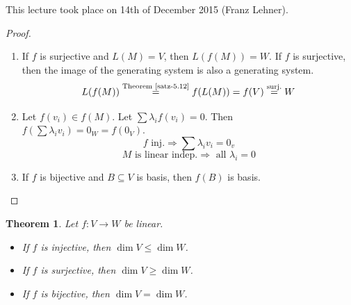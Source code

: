 \documentclass[a4paper,landscape,twocolumn]{article}
\newcommand\meta[3]{This #1 took place on #2 (#3).\par}
\newtheorem{theorem}{Theorem}
\begin{document}
\meta{lecture}{14th of December 2015}{Franz Lehner}

\begin{proof}
  \label{proof-5-13}
  \begin{enumerate}
    \item
      If $f$ is surjective and $L(M) = V$, then $L(f(M)) = W$.
      If $f$ is surjective, then the image of the generating system is also a generating system.
      \[ L(f(M)) \stackrel{\text{Theorem~\ref{satz-5.12}}}{=} f(L(M)) = f(V) \stackrel{\text{surj.}}{=} W \]
    \item
      Let $f(v_i) \in f(M)$.
      Let $\sum \lambda_i f(v_i) = 0$. Then $f(\sum \lambda_i v_i) = 0_W = f(0_V)$.
      \[ f \text{ inj.} \Rightarrow \sum \lambda_i v_i = 0_v \]
      \[ M \text{ is linear indep.} \Rightarrow \text{ all } \lambda_i = 0 \]
    \item If $f$ is bijective and $B \subseteq V$ is basis, then $f(B)$ is basis.
  \end{enumerate}
\end{proof}

\begin{theorem}
  \label{satz-5-14}
  Let $f: V \rightarrow W$ be linear.
  \begin{itemize}
    \item If $f$ is injective, then $\dim{V} \leq \dim{W}$.
    \item If $f$ is surjective, then $\dim{V} \geq \dim{W}$.
    \item If $f$ is bijective, then $\dim{V} = \dim{W}$.
  \end{itemize}
\end{theorem}
\end{document}
